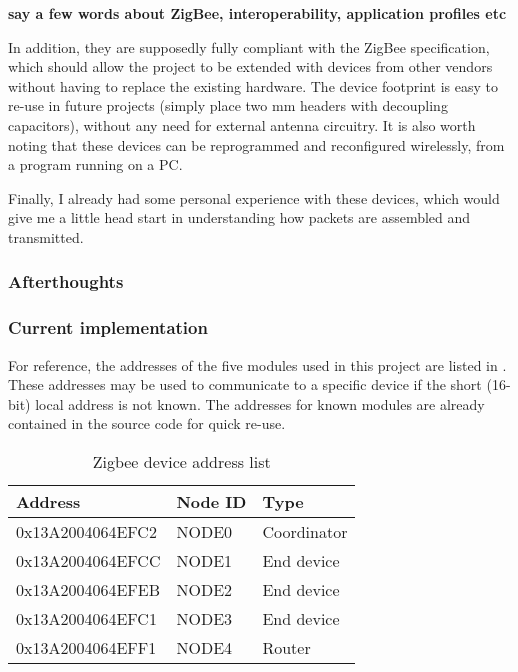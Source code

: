 \textbf{say a few words about ZigBee, interoperability, application profiles
etc}

In addition, they are supposedly fully compliant with the
ZigBee specification, which should allow the project to
be extended with devices from other vendors without having to replace the
existing hardware. The device footprint is easy to re-use in future projects
(simply place two \unit[2]{mm} headers with decoupling capacitors), without any
need for external antenna circuitry. It is also worth noting that these devices
can be reprogrammed and reconfigured wirelessly, from a program running on a PC.

Finally, I already had some personal experience with these devices, which would
give me a little head start in understanding how packets are assembled and
transmitted.

\subsubsection{Afterthoughts}

\subsubsection{Current implementation}
For reference, the addresses of the five modules used in this project are listed
in . These addresses may be used to communicate to a specific
device if the short (16-bit) local address is not known. The addresses for known
modules are already contained in the source code for quick re-use.

\begin{table}[h]
  \centering
  \begin{tabular}{l|l|l}
    Address & Node ID & Type \\
    \hline
    0x13A2004064EFC2 & NODE0 & Coordinator \\
    0x13A2004064EFCC & NODE1 & End device \\
    0x13A2004064EFEB & NODE2 & End device \\
    0x13A2004064EFC1 & NODE3 & End device \\
    0x13A2004064EFF1 & NODE4 & Router \\
  \end{tabular}
  \caption{Zigbee device address list}
  \label{tab:addresses}
\end{table}

